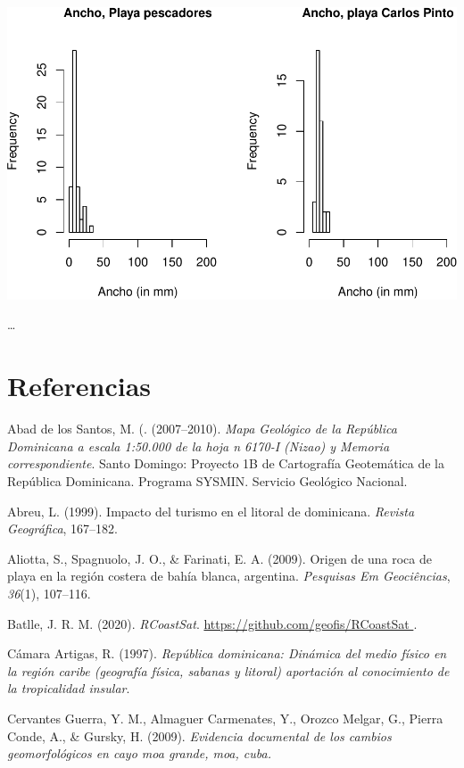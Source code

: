 \documentclass[11pt,]{article}
\begin{document}
\includegraphics{manuscrito_files/figure-latex/unnamed-chunk-6-4.pdf}

\ldots

\section*{Referencias}\label{referencias}

\hypertarget{refs}{}
\hypertarget{ref-abad2007mapageonizao}{}
Abad de los Santos, M. (. (2007--2010). \emph{Mapa Geológico de la
República Dominicana a escala 1:50.000 de la hoja n 6170-I (Nizao) y
Memoria correspondiente}. Santo Domingo: Proyecto 1B de Cartografía
Geotemática de la República Dominicana. Programa SYSMIN. Servicio
Geológico Nacional.

\hypertarget{ref-abreu1999impacto}{}
Abreu, L. (1999). Impacto del turismo en el litoral de dominicana.
\emph{Revista Geográfica}, 167--182.

\hypertarget{ref-aliotta2009origen}{}
Aliotta, S., Spagnuolo, J. O., \& Farinati, E. A. (2009). Origen de una
roca de playa en la región costera de bahía blanca, argentina.
\emph{Pesquisas Em Geociências}, \emph{36}(1), 107--116.

\hypertarget{ref-rcoastsat}{}
Batlle, J. R. M. (2020). \emph{RCoastSat}.
\href{\%0Ahttps://github.com/geofis/RCoastSat\%0A}{
https://github.com/geofis/RCoastSat
}.

\hypertarget{ref-camara1997republica}{}
Cámara Artigas, R. (1997). \emph{República dominicana: Dinámica del
medio físico en la región caribe (geografía física, sabanas y litoral)
aportación al conocimiento de la tropicalidad insular}.

\hypertarget{ref-cervantes2009evidencia}{}
Cervantes Guerra, Y. M., Almaguer Carmenates, Y., Orozco Melgar, G.,
Pierra Conde, A., \& Gursky, H. (2009). \emph{Evidencia documental de
los cambios geomorfológicos en cayo moa grande, moa, cuba.}
\end{document}
